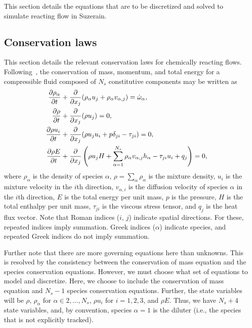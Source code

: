 This section details the equations that are to be discretized and
solved to simulate reacting flow in Suzerain.

\subsection{Conservation laws}
This section details the relevant conservation laws for chemically
  reacting flows.  Following~\cite{Anderson_hypersonics,
  Kirk_2009_FINS_model_doc,
  Topalian_2011_temporal_slow_growth_reacting}, the conservation of
  mass, momentum, and total energy for a compressible fluid composed
  of $N_s$ constitutive components may be written as
%
\begin{align*}
  \frac{\partial \rho_{\alpha}}{\partial t} & + \frac{\partial }{\partial x_j} (\rho_{\alpha} u_j + \rho_{\alpha} v_{\alpha, j}) = \dot{\omega}_{\alpha}, \\
  \frac{\partial \rho}{\partial t} & + \frac{\partial }{\partial x_j} (\rho u_j) = 0, \\
  \frac{\partial \rho u_i}{\partial t} & + \frac{\partial }{\partial x_j} (\rho u_j u_i + p \delta_{ji} - \tau_{ji}) = 0, \\
  \frac{\partial \rho E}{\partial t} & + \frac{\partial }{\partial x_j} \left(\rho u_j H + \sum_{\alpha=1}^{N_s} \rho_{\alpha} v_{\alpha, j} h_{\alpha}  - \tau_{ji} u_i + q_j \right) = 0,\\
\end{align*}
% 
where $\rho_{\alpha}$ is the density of species $\alpha$, $\rho=\sum_{\alpha} \rho_{\alpha}$
is the mixture density, $u_i$ is the mixture velocity in the $i$th
direction, $v_{\alpha, i}$ is the diffusion velocity of species $\alpha$ in the
$i$th direction, $E$ is the total energy per unit mass, $p$ is the
pressure, $H$ is the total enthalpy per unit mass, $\tau_{ji}$ is the
viscous stress tensor, and $q_j$ is the heat flux vector.  Note that
Roman indices ($i$, $j$) indicate spatial directions.  For these,
repeated indices imply summation.  Greek indices ($\alpha$) indicate
species, and repeated Greek indices do not imply summation.

Further note that there are more governing equations here than
unknowns.  This is resolved by the consistency between the
conservation of mass equation and the species conservation equations.
However, we must choose what set of equations to model and discretize.
Here, we choose to include the conservation of mass equation and $N_s
-1$ species conservation equations.  Further, the state variables will
be $\rho$, $\rho_{\alpha}$ for $\alpha \in 2, \ldots, N_s$, $\rho u_i$
for $i = 1, 2, 3$, and $\rho E$.  Thus, we have $N_s + 4$ state
variables, and, by convention, species $\alpha = 1$ is the diluter
(i.e., the species that is not explicitly tracked).

